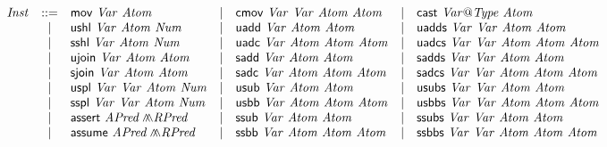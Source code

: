 \begin{figure*}
\begin{math}
\begin{array}{rclclcl}
      \mathit{Inst} & ::= &
            \clMov\ \mathit{Var}\ \mathit{Atom}
      & | & \clCmov\ \mathit{Var}\ \mathit{Var}\
            \mathit{Atom}\ \mathit{Atom}
      & | & \clVPCast\ \mathit{Var}\mathsf{@}\mathit{Type}\ \mathit{Atom}\\
      & | & \clUShl\ \mathit{Var}\ \mathit{Atom}\ \mathit{Num}
      & | & \clUAdd\ \mathit{Var}\ \mathit{Atom}\ \mathit{Atom}
      & | & \clUAdds\ \mathit{Var}\ \mathit{Var}\
            \mathit{Atom}\ \mathit{Atom}\\
      & | & \clSShl\ \mathit{Var}\ \mathit{Atom}\ \mathit{Num}
      & | & \clUAdc\ \mathit{Var}\ \mathit{Atom}\
            \mathit{Atom}\ \mathit{Atom}
      & | & \clUAdcs\ \mathit{Var}\ \mathit{Var}\
            \mathit{Atom}\ \mathit{Atom}\ \mathit{Atom}\\
      & | & \clUJoin\ \mathit{Var}\ \mathit{Atom}\ \mathit{Atom}
      & | & \clSAdd\ \mathit{Var}\ \mathit{Atom}\ \mathit{Atom}
      & | & \clSAdds\ \mathit{Var}\ \mathit{Var}\
            \mathit{Atom}\ \mathit{Atom}\\
      & | & \clSJoin\ \mathit{Var}\ \mathit{Atom}\ \mathit{Atom}
      & | & \clSAdc\ \mathit{Var}\ \mathit{Atom}\
            \mathit{Atom}\ \mathit{Atom}
      & | & \clSAdcs\ \mathit{Var}\ \mathit{Var}\
            \mathit{Atom}\ \mathit{Atom}\ \mathit{Atom}\\
      & | & \clUSplit\ \mathit{Var}\ \mathit{Var}\
            \mathit{Atom}\ \mathit{Num}
      & | & \clUSub\ \mathit{Var}\ \mathit{Atom}\ \mathit{Atom}
      & | & \clUSubs\ \mathit{Var}\ \mathit{Var}\
            \mathit{Atom}\ \mathit{Atom}\\
      & | & \clSSplit\ \mathit{Var}\ \mathit{Var}\
            \mathit{Atom}\ \mathit{Num}
      & | & \clUSbb\ \mathit{Var}\ \mathit{Atom}\
            \mathit{Atom}\ \mathit{Atom}
      & | & \clUSbbs\ \mathit{Var}\ \mathit{Var}\
            \mathit{Atom}\ \mathit{Atom}\ \mathit{Atom}\\
      & | & \clAssert\ \mathit{APred} \clConj \mathit{RPred}
      & | & \clSSub\ \mathit{Var}\ \mathit{Atom}\ \mathit{Atom}
      & | & \clSSubs\ \mathit{Var}\ \mathit{Var}\
            \mathit{Atom}\ \mathit{Atom}\\
      & | & \clAssume\ \mathit{APred} \clConj \mathit{RPred}
      & | & \clSSbb\ \mathit{Var}\ \mathit{Atom}\
            \mathit{Atom}\ \mathit{Atom}
      & | & \clSSbbs\ \mathit{Var}\ \mathit{Var}\
            \mathit{Atom}\ \mathit{Atom}\ \mathit{Atom}\\

\end{array}
\end{math}
\end{figure*}
